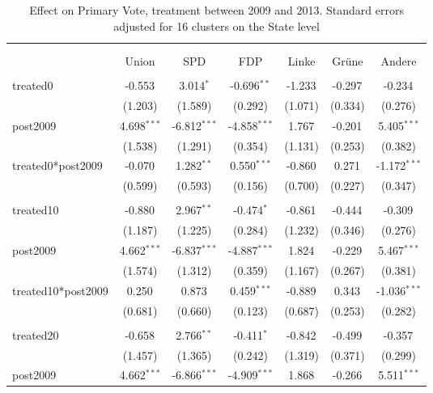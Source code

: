 \documentclass[12pt]{article}
\begin{document}
 
\begin{table}[!htbp] \centering
  \caption{Effect on Primary Vote, treatment between 2009 and 2013. Standard errors adjusted for 16 clusters on the State level}
\begin{tabular}{@{\extracolsep{5pt}}lcccccc}
\\[-1.8ex]\hline
\hline \\[-1.8ex]
\\[-1.8ex] & \multicolumn{1}{c}{Union} & \multicolumn{1}{c}{SPD} & \multicolumn{1}{c}{FDP} & \multicolumn{1}{c}{Linke} & \multicolumn{1}{c}{Grüne} & \multicolumn{1}{c}{Andere}  \\
\hline \\[-1.8ex]
 treated0 & -0.553$^{}$ & 3.014$^{*}$ & -0.696$^{**}$ & -1.233$^{}$ & -0.297$^{}$ & -0.234$^{}$ \\
  & (1.203) & (1.589) & (0.292) & (1.071) & (0.334) & (0.276) \\
 post2009 & 4.698$^{***}$ & -6.812$^{***}$ & -4.858$^{***}$ & 1.767$^{}$ & -0.201$^{}$ & 5.405$^{***}$ \\
  & (1.538) & (1.291) & (0.354) & (1.131) & (0.253) & (0.382) \\
 treated0*post2009 & -0.070$^{}$ & 1.282$^{**}$ & 0.550$^{***}$ & -0.860$^{}$ & 0.271$^{}$ & -1.172$^{***}$ \\
  & (0.599) & (0.593) & (0.156) & (0.700) & (0.227) & (0.347) \\
\hline \\[-1.8ex]
 treated10 & -0.880$^{}$ & 2.967$^{**}$ & -0.474$^{*}$ & -0.861$^{}$ & -0.444$^{}$ & -0.309$^{}$ \\
  & (1.187) & (1.225) & (0.284) & (1.232) & (0.346) & (0.276) \\
 post2009 & 4.662$^{***}$ & -6.837$^{***}$ & -4.887$^{***}$ & 1.824$^{}$ & -0.229$^{}$ & 5.467$^{***}$ \\
  & (1.574) & (1.312) & (0.359) & (1.167) & (0.267) & (0.381) \\
 treated10*post2009 & 0.250$^{}$ & 0.873$^{}$ & 0.459$^{***}$ & -0.889$^{}$ & 0.343$^{}$ & -1.036$^{***}$ \\
  & (0.681) & (0.660) & (0.123) & (0.687) & (0.253) & (0.282) \\
\hline \\[-1.8ex]
 treated20 & -0.658$^{}$ & 2.766$^{**}$ & -0.411$^{*}$ & -0.842$^{}$ & -0.499$^{}$ & -0.357$^{}$ \\
  & (1.457) & (1.365) & (0.242) & (1.319) & (0.371) & (0.299) \\
 post2009 & 4.662$^{***}$ & -6.866$^{***}$ & -4.909$^{***}$ & 1.868$^{}$ & -0.266$^{}$ & 5.511$^{***}$ \\

\end{tabular}
\end{table}
\end{document}
